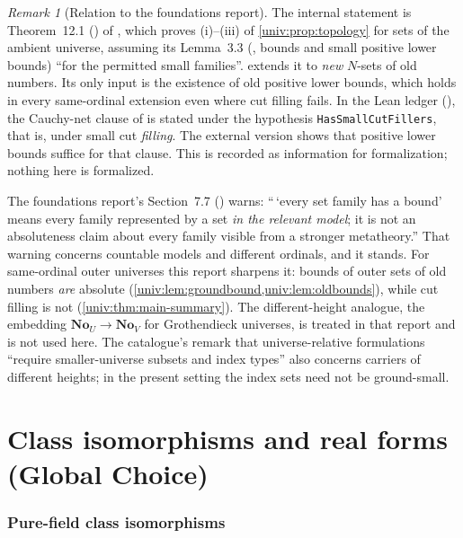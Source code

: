 \documentclass[11pt,letterpaper]{article}
\numberwithin{equation}{section}
\theoremstyle{definition}
\theoremstyle{remark}
\newtheorem{remark}[remark]{Remark}
\newcommand{\No}{\mathbf{No}}
\begin{document}
\begin{remark}[Relation to the foundations report]\label{univ:rem:foundations}
The internal statement is Theorem~12.1 () of
, which proves (i)--(iii) of
\cref{univ:prop:topology} for sets of the ambient universe, assuming its
Lemma~3.3 (, bounds and small positive lower bounds)
``for the permitted small families''.  extends it to
\emph{new} $N$-sets of old numbers. Its only input is the existence of old
positive lower bounds, which holds in every same-ordinal extension even where
cut filling fails. In the Lean ledger (), the
Cauchy-net clause of  is stated under the hypothesis
\texttt{HasSmallCutFillers}, that is, under small cut \emph{filling}. The
external version shows that positive lower bounds suffice for that clause.
This is recorded as information for formalization; nothing here is formalized.

The foundations report's Section~7.7 () warns:
``\,`every set family has a bound' means every family represented by a set
\emph{in the relevant model}; it is not an absoluteness claim about every family
visible from a stronger metatheory.'' That warning concerns countable models
and different ordinals, and it stands. For same-ordinal outer universes this
report sharpens it: bounds of outer sets of old numbers \emph{are} absolute
(\cref{univ:lem:groundbound,univ:lem:oldbounds}), while cut filling is not
(\cref{univ:thm:main-summary}). The different-height analogue, the embedding
$\No_U\to\No_V$ for Grothendieck universes, is treated in that report and is
not used here. The catalogue's remark that universe-relative formulations
``require smaller-universe subsets and index types'' also concerns carriers of
different heights; in the present setting the index sets need not be
ground-small.
\end{remark}

\part{Class isomorphisms and real forms (Global Choice)}\label{univ:part:realforms}

\section{Pure-field class isomorphisms}\label{univ:sec:classiso}
\end{document}
